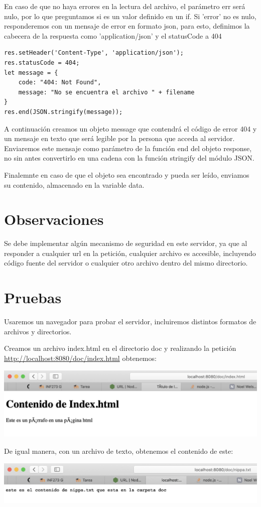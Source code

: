 \documentclass[11pt]{article}
\begin{document}
En caso de que no haya errores en la lectura del archivo, el parámetro err será nulo,
por lo que preguntamos si es un valor definido en un if.
Si 'error' no es nulo, responderemos con un mensaje de error en formato json,
para esto, definimos la cabecera de la respuesta como 'application/json' y
el statusCode a 404

\begin{verbatim}
res.setHeader('Content-Type', 'application/json');
res.statusCode = 404;
let message = {
    code: "404: Not Found",
    message: "No se encuentra el archivo " + filename
}
res.end(JSON.stringify(message));
\end{verbatim}

A continuación creamos un objeto message que contendrá el código de error 404
y un mensaje en texto que será legible por la persona que acceda al servidor.
Enviaremos este mensaje como parámetro de la función end del objeto response,
no sin antes convertirlo en una cadena con la función stringify del módulo JSON.

Finalemnte en caso de que el objeto sea encontrado y pueda ser leído,
enviamos su contenido, almacenado en la variable data.

\section{Observaciones}
\label{sec:org052d339}
Se debe implementar algún mecanismo de seguridad en este servidor, ya que al responder a cualquier url en la petición,
cualquier archivo es accesible, incluyendo código fuente del servidor o cualquier otro archivo dentro
del mismo directorio.

\section{Pruebas}
\label{sec:org60cbfb6}
Usaremos un navegador para probar el servidor, incluiremos distintos formatos de archivos y directorios.

Creamos un archivo index.html en el directorio doc y realizando la petición \url{http://localhost:8080/doc/index.html} obtenemos:

\begin{center}
\includegraphics[width=.9\linewidth]{./captura.png}
\end{center}

De igual manera, con un archivo de texto, obtenemos el contenido de este:
\begin{center}
\includegraphics[width=.9\linewidth]{./captura2.png}
\end{center}
\end{document}
